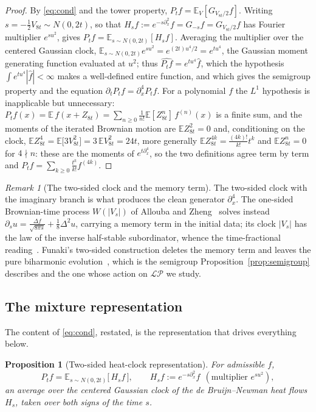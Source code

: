 \documentclass[11pt,reqno]{amsart}
\theoremstyle{plain}
\newtheorem{proposition}[theorem]{Proposition}
\theoremstyle{definition}
\theoremstyle{remark}
\newtheorem{remark}[theorem]{Remark}
\newcommand{\E}{\mathbb E}
\newcommand{\LP}{\mathcal{LP}}
\begin{document}
\begin{proof}
By \eqref{eq:cond} and the tower property, $P_tf=\E_V[G_{V_{8t}/2}f]$. Writing
$s=-\tfrac12V_{8t}\sim N(0,2t)$, so that $H_sf:=e^{-s\partial_x^2}f=G_{-s}f=
G_{V_{8t}/2}f$ has Fourier multiplier $e^{su^2}$, gives
$P_tf=\E_{s\sim N(0,2t)}[H_sf]$. Averaging the multiplier
over the centered Gaussian clock,
$\E_{s\sim N(0,2t)}e^{su^2}=e^{(2t)u^4/2}=e^{tu^4}$, the Gaussian moment
generating function evaluated at $u^2$; thus $\widehat{P_tf}=e^{tu^4}\hat f$,
which the hypothesis $\int e^{tu^4}|\hat f|<\infty$ makes a well-defined entire
function, and which gives the semigroup property and the equation
$\partial_tP_tf=\partial_x^4P_tf$. For a polynomial $f$ the $L^1$ hypothesis is
inapplicable but unnecessary: $P_tf(x)=\E\,f(x+Z_{8t})=\sum_{n\ge0}
\tfrac{1}{n!}\E[Z_{8t}^n]\,f^{(n)}(x)$ is a finite sum, and the moments of the
iterated Brownian motion are $\E Z_{8t}^{2}=0$ and, conditioning on the clock,
$\E Z_{8t}^{4}=\E\bigl[3V_{8t}^2\bigr]=3\,\E V_{8t}^2=24t$, more generally
$\E Z_{8t}^{4k}=\tfrac{(4k)!}{k!}t^k$ and $\E Z_{8t}^{n}=0$ for $4\nmid n$: these
are the moments of $e^{t\partial_x^4}$, so the two definitions agree term by
term and $P_tf=\sum_{k\ge0}\tfrac{t^k}{k!}f^{(4k)}$.
\end{proof}

\begin{remark}[The two-sided clock and the memory term]\label{rem:allouba}
The two-sided clock with the imaginary branch is what produces the clean
generator $\partial_x^4$. The one-sided Brownian-time process $W(|V_s|)$ of
Allouba and Zheng~\cite{AlloubaZheng} solves instead
$\partial_su=\tfrac{\Delta f}{\sqrt{8\pi s}}+\tfrac18\Delta^2u$, carrying a
memory term in the initial data; its clock $|V_s|$ has the law of the inverse
half-stable subordinator, whence the time-fractional reading~\cite{BMN}. Funaki's
two-sided construction deletes the memory term and leaves the pure
biharmonic evolution~\cite{Funaki}, which is the semigroup
Proposition~\ref{prop:semigroup} describes and the one whose action on $\LP$
we study.
\end{remark}

\subsection{The mixture representation}
The content of \eqref{eq:cond}, restated, is the representation that drives
everything below.

\begin{proposition}[Two-sided heat-clock representation]\label{prop:mixture}
For admissible $f$,
\begin{equation}\label{eq:mix}
   P_tf=\E_{s\sim N(0,2t)}\bigl[\,H_sf\,\bigr],
   \qquad H_sf:=e^{-s\partial_x^2}f\ \ (\text{multiplier }e^{su^2}),
\end{equation}
an average over the centered Gaussian clock of the de Bruijn--Newman
heat flows $H_s$, taken over both signs of the time $s$.
\end{proposition}
\end{document}
